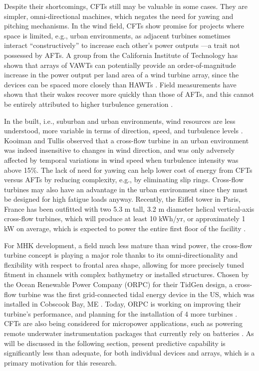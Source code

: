Despite their shortcomings, CFTs still may be valuable in some cases. They are
simpler, omni-directional machines, which negates the need for yawing and
pitching mechanisms. In the wind field, CFTs show promise for projects where
space is limited, e.g., urban environments, as adjacent turbines sometimes
interact ``constructively'' to increase each other's power outputs
\cite{Li2010}---a trait not possessed by AFTs. A group from the California
Institute of Technology has shown that arrays of VAWTs can potentially provide
an order-of-magnitude increase in the power output per land area of a wind
turbine array, since the devices can be spaced more closely than HAWTs
\cite{Dabiri2011}. Field measurements have shown that their wakes recover more
quickly than those of AFTs, and this cannot be entirely attributed to higher
turbulence generation \cite{Kinzel2012}.

In the built, i.e., suburban and urban environments, wind resources are less
understood, more variable in terms of direction, speed, and turbulence levels
\cite{Smith2012}. Kooiman and Tullis \cite{Kooiman2010} observed that a
cross-flow turbine in an urban environment was indeed insensitive to changes in
wind direction, and was only adversely affected by temporal variations in wind
speed when turbulence intensity was above 15\%. The lack of need for yawing can
help lower cost of energy from CFTs versus AFTs by reducing complexity, e.g., by
eliminating slip rings. Cross-flow turbines may also have an advantage in the
urban environment since they must be designed for high fatigue loads anyway.
Recently, the Eiffel tower in Paris, France has been outfitted with two 5.3 m
tall, 3.2 m diameter helical vertical-axis cross-flow turbines, which will
produce at least 10 kWh/yr, or approximately 1 kW on average, which is expected
to power the entire first floor of the facility \cite{Lott2015}.

For MHK development, a field much less mature than wind power, the cross-flow
turbine concept is playing a major role thanks to its omni-directionality and
flexibility with respect to frontal area shape, allowing for more precisely
tuned fitment in channels with complex bathymetry or installed structures.
Chosen by the Ocean Renewable Power Company (ORPC) for their TidGen design, a
cross-flow turbine was the first grid-connected tidal energy device in the US,
which was installed in Cobscook Bay, ME \cite{ORPC2012}. Today, ORPC is working
on improving their turbine's performance, and planning for the installation of 4
more turbines \cite{Nelson2013}. CFTs are also being considered for micropower
applications, such as powering remote underwater instrumentation packages that
currently rely on batteries \cite{Polagye2013b}. As will be discussed in the
following section, present predictive capability is significantly less than
adequate, for both individual devices and arrays, which is a primary motivation
for this research.


